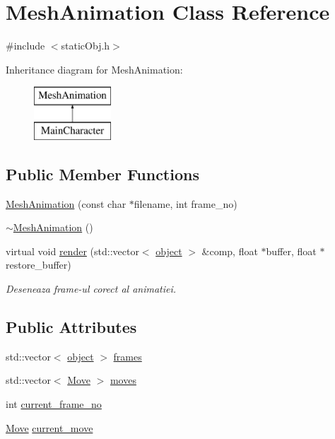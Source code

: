\hypertarget{class_mesh_animation}{\section{Mesh\-Animation Class Reference}
\label{class_mesh_animation}
}


{\ttfamily \#include $<$static\-Obj.\-h$>$}

Inheritance diagram for Mesh\-Animation\-:\begin{figure}[H]
\begin{center}
\leavevmode
\includegraphics[height=2.000000cm]{class_mesh_animation}
\end{center}
\end{figure}
\subsection*{Public Member Functions}
\begin{DoxyCompactItemize}
\item 
\hyperlink{class_mesh_animation_a567a0c3da9b6ab4f8731ca9a2d292122}{Mesh\-Animation} (const char $\ast$filename, int frame\-\_\-no)
\item 
\hyperlink{class_mesh_animation_ab5b3efcd554bf01b8fd04120fc93c8df}{$\sim$\-Mesh\-Animation} ()
\item 
virtual void \hyperlink{class_mesh_animation_ae64ddb4d27ebb9d64fe11b2e3143754e}{render} (std\-::vector$<$ \hyperlink{structobject}{object} $>$ \&comp, float $\ast$buffer, float $\ast$restore\-\_\-buffer)
\begin{DoxyCompactList}\small\item\em Deseneaza frame-\/ul corect al animatiei. \end{DoxyCompactList}\end{DoxyCompactItemize}
\subsection*{Public Attributes}
\begin{DoxyCompactItemize}
\item 
std\-::vector$<$ \hyperlink{structobject}{object} $>$ \hyperlink{class_mesh_animation_a925b14f1959e8978bf2381cae04faddc}{frames}
\item 
std\-::vector$<$ \hyperlink{struct_move}{Move} $>$ \hyperlink{class_mesh_animation_a143c0f0b32676ba0cc63c5596f129b21}{moves}
\item 
int \hyperlink{class_mesh_animation_a38be50473060fbf1433104c3ebf4dda6}{current\-\_\-frame\-\_\-no}
\item 
\hyperlink{struct_move}{Move} \hyperlink{class_mesh_animation_a0e99877081ae52a2b74d890a346a5298}{current\-\_\-move}
\end{DoxyCompactItemize}



